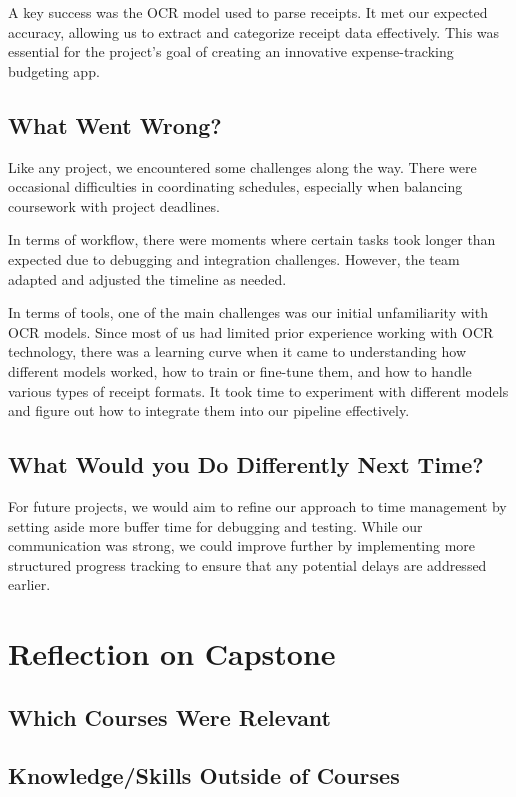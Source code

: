 \documentclass{article}
\begin{document}
A key success was the OCR model used to parse receipts. It met our expected accuracy, allowing us to extract and categorize receipt data effectively.
This was essential for the project's goal of creating an innovative expense-tracking budgeting app.

\subsection{What Went Wrong?}

Like any project, we encountered some challenges along the way. There were occasional difficulties in coordinating 
schedules, especially when balancing coursework with project deadlines. 

In terms of workflow, there were moments where certain tasks took longer than expected due to debugging and integration challenges.
However, the team adapted and adjusted the timeline as needed.

In terms of tools, one of the main challenges was our initial unfamiliarity with OCR models. Since most of us had limited prior experience working with OCR technology,
there was a learning curve when it came to understanding how different models worked, how to train or fine-tune them, and how to handle various types of receipt formats. 
It took time to experiment with different models and figure out how to integrate them into our pipeline effectively.

\subsection{What Would you Do Differently Next Time?}

For future projects, we would aim to refine our approach to time management by setting aside more buffer time for debugging and testing. 
While our communication was strong, we could improve further by implementing more structured progress tracking to ensure that any potential delays are addressed earlier.

\section{Reflection on Capstone}


\subsection{Which Courses Were Relevant}


\subsection{Knowledge/Skills Outside of Courses}

\end{document}
